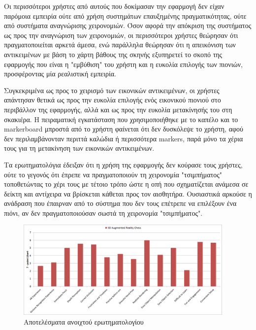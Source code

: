 Οι περισσότεροι χρήστες από αυτούς που δοκίμασαν την εφαρμογή δεν είχαν παρόμοια εμπειρία ούτε από χρήση συστημάτων επαυξημένης πραγματικότητας, ούτε από συστήματα αναγνώρισης χειρονομιών.
Όσον αφορά την απόκριση της συστήματος ως προς την αναγνώριση των χειρονομιών, οι περισσότεροι χρήστες θεώρησαν ότι πραγματοποιείται αρκετά άμεσα, ενώ παράλληλα θεώρησαν ότι η απεικόνιση των αντικειμένων με βάση το χάρτη βάθους της σκηνής εξυπηρετεί το σκοπό της εφαρμογής που είναι η "εμβύθιση" του χρήστη και η ευκολία επιλογής των πιονιών, προσφέροντας μία ρεαλιστική εμπειρία.

Συγκεκριμένα ως προς το χειρισμό των εικονικών αντικειμένων, οι χρήστες απάντησαν θετικά ως προς την ευκολία επιλογής ενός εικονικού πιονιού στο περιβάλλον της εφαρμογής, αλλά και ως προς την ευκολία μετακίνησής του στη σκακιέρα. Η πειραματική εγκατάσταση που χρησιμοποιήθηκε με το καπέλο και το markerboard μπροστά από το χρήστη φαίνεται ότι δεν δυσκόλεψε το χρήστη, αφού δεν περιλαμβάνονταν περιττά καλώδια ή περισσότερα markers, παρά μόνο τα χέρια τους για τη μετακίνηση των εικονικών αντικειμένων.


Τα ερωτηματολόγια έδειξαν ότι η χρήση της εφαρμογής δεν κούρασε τους χρήστες, ούτε το γεγονός ότι έπρεπε να πραγματοποιούν τη χειρονομία "τσιμπήματος" τοποθετώντας το χέρι τους με τέτοιο τρόπο ώστε η οπή που σχηματίζεται ανάμεσα σε δείκτη και αντίχειρα να βρίσκεται κάθεται προς τον αισθητήρα. Ουσιαστικά αρκούσε η ανάδραση που έπαιρναν από το σύστημα που δεν τους επέτρεπε να επιλέξουν ένα πιόνι, αν δεν πραγματοποιούσαν σωστά τη χειρονομία "τσιμπήματος". 

\begin{figure}[H]
    \centering
    \includegraphics[width=0.95\textwidth]{Files/Figures/questionnaire.png}
     \caption[Αποτελέσματα ανοιχτού ερωτηματολογίου]{Αποτελέσματα ανοιχτού ερωτηματολογίου}
    \label{fig:open}
\end{figure}




